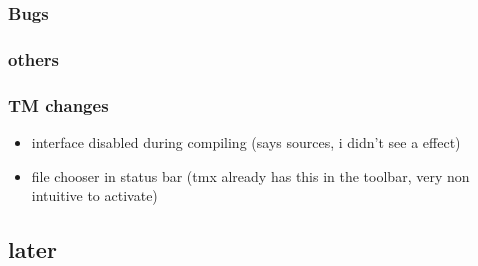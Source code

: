 \documentclass[10pt,a4paper,landscape]{report}
\begin{document}
\subsubsection{Bugs}

\subsubsection{others}

\subsubsection{TM changes}

\begin{itemize}
\item interface disabled during compiling (says sources, i didn't see a effect)
\item file chooser in status bar (tmx already has this in the toolbar, very non intuitive to activate)
\end{itemize}

\subsection{later}
\end{document}
